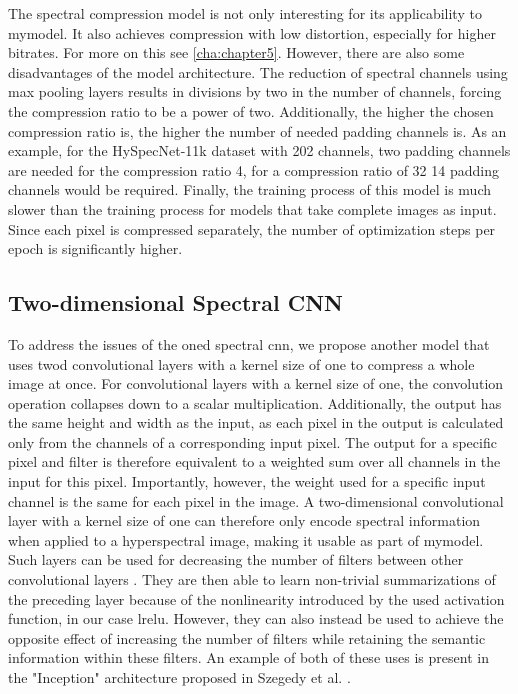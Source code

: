 The spectral compression model is not only interesting for its applicability to \ac{mymodel}. It also achieves compression with low distortion, especially for higher bitrates. For more on this see \autoref{cha:chapter5}. However, there are also some disadvantages of the model architecture. The reduction of spectral channels using max pooling layers results in divisions by two in the number of channels, forcing the compression ratio to be a power of two. Additionally, the higher the chosen compression ratio is, the higher the number of needed padding channels is. As an example, for the HySpecNet-11k dataset with 202 channels, two padding channels are needed for the compression ratio 4, for a compression ratio of 32 14 padding channels would be required. Finally, the training process of this model is much slower than the training process for models that take complete images as input. Since each pixel is compressed separately, the number of optimization steps per epoch is significantly higher.
\subsection{Two-dimensional Spectral CNN\label{sec:fastconv1d}}
To address the issues of the \ac{oned} spectral \ac{cnn}, we propose another model that uses \ac{twod} convolutional layers with a kernel size of one to compress a whole image at once. For convolutional layers with a kernel size of one, the convolution operation collapses down to a scalar multiplication. Additionally, the output has the same height and width as the input, as each pixel in the output is calculated only from the channels of a corresponding input pixel. The output for a specific pixel and filter is therefore equivalent to a weighted sum over all channels in the input for this pixel. Importantly, however, the weight used for a specific input channel is the same for each pixel in the image. A two-dimensional convolutional layer with a kernel size of one can therefore only encode spectral information when applied to a hyperspectral image, making it usable as part of \ac{mymodel}. Such layers can be used for decreasing the number of filters between other convolutional layers \citep{szegedy_going_2015}. They are then able to learn non-trivial summarizations of the preceding layer because of the nonlinearity introduced by the used activation function, in our case \ac{lrelu}. However, they can also instead be used to achieve the opposite effect of increasing the number of filters while retaining the semantic information within these filters. An example of both of these uses is present in the "Inception" architecture proposed in Szegedy et al. \citep{szegedy_going_2015}.

